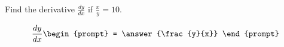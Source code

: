 \documentclass{ximera}
\author{Gregory Hartman \and Matthew Carr}
\begin{document}
\begin{exercise}



Find the derivative $\frac{dy}{dx}$ if $\frac{x}{y}=10$.

\[
\frac{dy}{dx}
\begin{prompt}
= \answer{\frac{y}{x}}
\end{prompt}
\]

\end{exercise}
\end{document}
